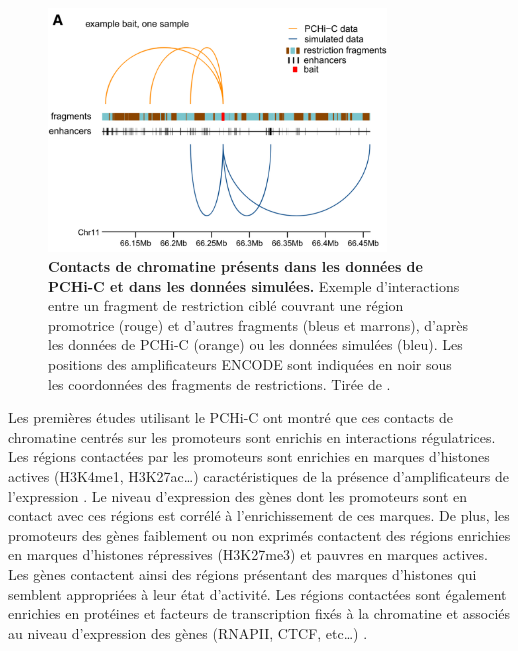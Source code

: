 \begin{figure}[h]
 \centering
 \includegraphics[width=0.8\textwidth, page=1]{figures/chap2/chap2-fig3.png}
 \caption[Contacts de chromatine présents dans les données de \gls{PCHi-C} et dans les données simulées.]{
 \textbf{Contacts de chromatine présents dans les données de \gls{PCHi-C} et dans les données simulées.} Exemple d'interactions entre un fragment de restriction ciblé couvrant une région promotrice (rouge) et d'autres fragments (bleus et marrons), d'après les données de \gls{PCHi-C} (orange) ou les données simulées (bleu). Les positions des \glspl{amplificateur} ENCODE sont indiquées en noir sous les coordonnées des fragments de restrictions. Tirée de \citet{laverre_long-range_2022}.\\
 }
 \label{fig:chap2-fig3}
\end{figure} 

Les premières études utilisant le \gls{PCHi-C} ont montré que ces contacts de chromatine centrés sur les promoteurs sont enrichis en interactions régulatrices. Les régions contactées par les promoteurs sont enrichies en marques d’histones actives (H3K4me1, H3K27ac…) caractéristiques de la présence d’\glspl{amplificateur} de l’expression \citep{schoenfelder_pluripotent_2015}. Le niveau d’expression des gènes dont les promoteurs sont en contact avec ces régions est corrélé à l’enrichissement de ces marques. De plus, les promoteurs des gènes faiblement ou non exprimés contactent des régions enrichies en marques d’histones répressives (H3K27me3) et pauvres en marques actives. Les gènes contactent ainsi des régions présentant des marques d’histones qui semblent appropriées à leur état d’activité. Les régions contactées sont également enrichies en protéines et facteurs de transcription fixés à la chromatine et associés au niveau d’expression des gènes (RNAPII, CTCF, etc…) \citep{javierre_lineage-specific_2016}.\\

